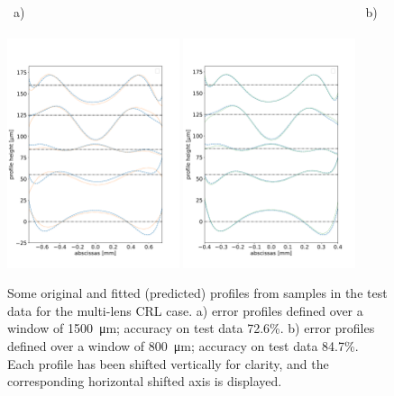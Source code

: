 \documentclass[preprint]{iucr}
\newcommand{\inred}[1]{{\color{red}#1}}
\begin{document}
\begin{figure}\label{fig:v26profiles}
~a)~~~~~~~~~~~~~~~~~~~~~~~~~~~~~~~~~~~~~~~~~~~~~~~~~~~~~~b)~~~~~~~~~~~~~~~~~~~~~~~~~~\\
\includegraphics[width=0.45\textwidth]{figures/figure7a.pdf}
\includegraphics[width=0.45\textwidth]{figures/figure7b.pdf}
\caption{
Some original and fitted (predicted) profiles from samples in the test data for the multi-lens CRL case. a) error profiles defined over a window of \SI{1500}{\micro\meter};
accuracy on test data 72.6\%. 
b) error profiles defined over a window of \SI{800}{\micro\meter};
accuracy on test data 84.7\%.
\inred{Each profile has been shifted vertically for clarity, and the corresponding horizontal shifted axis is displayed.
    }
    }
\end{figure}

\end{document}
